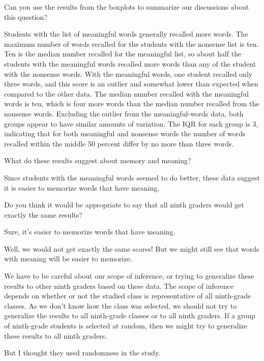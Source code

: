 \documentclass[
  10pt,
  a4paper,
  landscape,
  twoside,
  openany
]{scrbook}
\newlength{\scriptlabelwidth}
\newcommand{\scriptlabel}[1]{%
  \normalfont\slshape\makebox[\scriptlabelwidth][l]{#1}%
}
\newenvironment{scriptlist}{%
  \begin{list}{}{%
    \setlength{\labelwidth}{\scriptlabelwidth}%
    \setlength{\labelsep}{0.6em}%
    \setlength{\leftmargin}{\dimexpr\labelwidth+\labelsep\relax}%
    \setlength{\itemindent}{0pt}%
    \setlength{\listparindent}{0pt}%
    \setlength{\parsep}{0pt}%
    \setlength{\itemsep}{0.35\baselineskip}%
    \setlength{\topsep}{0.35\baselineskip}%
    \let\makelabel\scriptlabel
  }%
}{%
  \end{list}%
}
\begin{document}
{\begin{scriptlist}
  \item [Teacher:] Can you use the results from the boxplots to summarize our discussions about this question?
  \item [Student M:] Students with the list of meaningful words generally recalled more words. The maximum number of words recalled for the students with the nonsense list is ten. Ten is the median number recalled for the meaningful list, so about half the students with the meaningful words recalled more words than any of the student with the nonsense words. With the meaningful words, one student recalled only three words, and this score is an outlier and somewhat lower than expected when compared to the other data. The median number recalled with the meaningful words is ten, which is four more words than the median number recalled from the nonsense words. Excluding the outlier from the meaningful-words data, both groups appear to have similar amounts of variation. The IQR for each group is 3, indicating that for both meaningful and nonsense words the number of words recalled within the middle 50 percent differ by no more than three words.
  \item [Teacher:] What do these results suggest about memory and meaning?
  \item [Student N:] Since students with the meaningful words seemed to do better, these data suggest it is easier to memorize words that have meaning.
  \item [Teacher:] Do you think it would be appropriate to say that all ninth graders would get exactly the same results?
  \item [Student O:] Sure, it's easier to memorize words that have meaning.
  \item [Student P:] Well, we would not get exactly the same scores! But we might still see that words with meaning will be easier to memorize.
  \item [Teacher:] We have to be careful about our scope of inference, or trying to generalize these results to other ninth graders based on these data. The scope of inference depends on whether or not the studied class is representative of all ninth-grade classes. As we don't know how the class was selected, we should not try to generalize the results to all ninth-grade classes or to all ninth graders. If a group of ninth-grade students is selected at random, then we might try to generalize these results to all ninth graders.
  \item [Student Q:] But I thought they used randomness in the study.

\end{scriptlist}}
\end{document}
